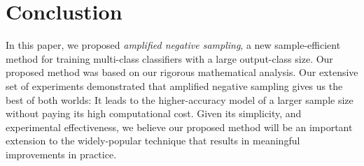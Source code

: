 





\section{Conclustion}
In this paper, we proposed \emph{amplified negative sampling}, a new sample-efficient method for training multi-class classifiers with a large output-class size. Our proposed method was based on our rigorous mathematical analysis. Our extensive set of experiments demonstrated that amplified negative sampling gives us the best of both worlds: It leads to the higher-accuracy model of a larger sample size without paying its high computational cost. Given its simplicity, and experimental effectiveness, we believe our proposed method will be an important extension to the widely-popular technique that results in meaningful improvements in practice.

\label{sec:NS:conclusion}
